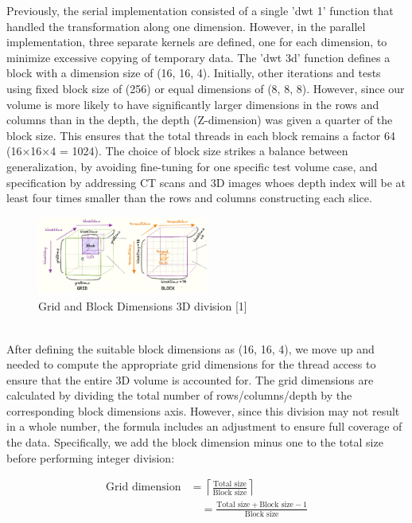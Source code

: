 \documentclass[journal,11pt]{IEEEtran}
\begin{document}
Previously, the serial implementation consisted of a single 'dwt 1' function that handled the transformation along one dimension. However, in the parallel implementation, three separate kernels are defined, one for each dimension, to minimize excessive copying of temporary data. The 'dwt 3d' function defines a block with a dimension size of (16, 16, 4). Initially, other iterations and tests using fixed block size of (256) or equal dimensions of (8, 8, 8). However, since our volume is more likely to have significantly larger dimensions in the rows and columns than in the depth, the depth (Z-dimension) was given a quarter of the block size. This ensures that the total threads in each block remains a factor 64 (16×16×4 = 1024). The choice of block size strikes a balance between generalization, by avoiding fine-tuning for one specific test volume case, and specification by addressing CT scans and 3D images whoes depth index will be at least four times smaller than the rows and columns constructing each slice.
\vspace{-1.2em}
\begin{figure}[h]
    \centering
    \includegraphics[width=0.5\textwidth]{assets/grid_block.png}
    \caption{Grid and Block Dimensions 3D division [1]}
    \label{fig:1}
\end{figure}
\vspace{-0.2em}\\
After defining the suitable block dimensions as (16, 16, 4), we move up and needed to compute the appropriate grid dimensions for the thread access to ensure that the entire 3D volume is accounted for. The grid dimensions are calculated by dividing the total number of rows/columns/depth by the corresponding block dimensions axis. However, since this division may not result in a whole number, the formula includes an adjustment to ensure full coverage of the data. Specifically, we add the block dimension minus one to the total size before performing integer division:

\begin{equation}
    \begin{aligned}
        \text{Grid dimension} &= \left\lceil \frac{\text{Total size}}{\text{Block size}} \right\rceil \\
        &\quad = \frac{\text{Total size} + \text{Block size} - 1}{\text{Block size}}
    \end{aligned}
\end{equation}
\\
\end{document}
